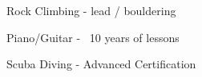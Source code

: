 
\begin{cventries}

  \cventry
    {Rock Climbing - lead / bouldering} %
    {} %
    {} %
    {} %
    {}

  \cventry
    {Piano/Guitar - ~10 years of lessons} %
    {} %
    {} %
    {} %
    {}

  \cventry
    {Scuba Diving - Advanced Certification} %
    {} %
    {} %
    {} %
    {}

\end{cventries}
